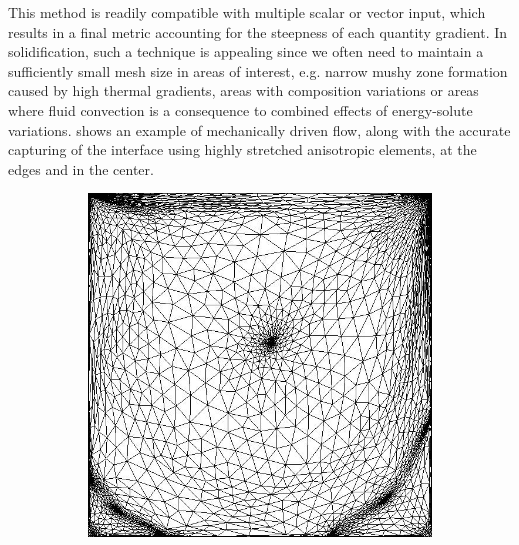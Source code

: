 This method is readily compatible with multiple scalar or vector input, which results in a final metric accounting
for the steepness of each quantity gradient. In solidification, such a technique is appealing since we often need 
to maintain a sufficiently small mesh size in areas of interest, e.g. narrow mushy zone formation caused by high thermal gradients, areas with composition variations or
areas where fluid convection is a consequence to combined effects of energy-solute variations.  shows an example of mechanically driven flow,
along with the accurate capturing of the interface using highly stretched anisotropic elements, at the edges and in the center.


\begin{figure}[htbp]
\centering
  \begin{subfigure}[t]{0.3\textwidth}
    \centering
 	\includegraphics[width=\textwidth]{Chapter2/Graphics/remesh4_1000.png}
	\caption{}
  \end{subfigure}
   \begin{subfigure}[t]{0.3\textwidth}
    \centering

\end{subfigure}
\end{figure}
